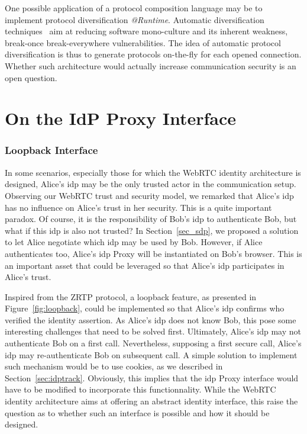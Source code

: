 One possible application of a protocol composition language may be to implement protocol diversification \textit{@Runtime}.
Automatic diversification techniques~\cite{allier15} aim at reducing software mono-culture and its inherent weakness, \ie break-once break-everywhere vulnerabilities.
The idea of automatic protocol diversification is thus to generate protocols on-the-fly for each opened connection.
Whether such architecture would actually increase communication security is an open question.


\section{On the IdP Proxy Interface}
\label{sec:peproxy}
\subsubsection{Loopback Interface}
In some scenarios, especially those for which the WebRTC identity architecture is designed, Alice's \gls{idp} may be the only trusted actor in the communication setup.
Observing our WebRTC trust and security model, we remarked that Alice's \gls{idp} has no influence on Alice's trust in her security.
This is a quite important paradox.
Of course, it is the responsibility of Bob's \gls{idp} to authenticate Bob, but what if this \gls{idp} is also not trusted?
In Section~\ref{sec_sdp}, we proposed a solution to let Alice negotiate which \gls{idp} may be used by Bob.
However, if Alice authenticates too, Alice's \gls{idp} Proxy will be instantiated on Bob's browser.
This is an important asset that could be leveraged so that Alice's \gls{idp} participates in Alice's trust.

Inspired from the ZRTP protocol, a loopback feature, as presented in Figure~\ref{fig:loopback}, could be implemented so that Alice's \gls{idp} confirms who verified the identity assertion.
As Alice's \gls{idp} does not know Bob, this pose some interesting challenges that need to be solved first.
Ultimately, Alice's \gls{idp} may not authenticate Bob on a first call.
Nevertheless, supposing a first secure call, Alice's \gls{idp} may re-authenticate Bob on subsequent call.
A simple solution to implement such mechanism would be to use cookies, as we described in Section~\ref{sec:idptrack}.
Obviously, this implies that the \gls{idp} Proxy interface would have to be modified to incorporate this functionnality.
While the WebRTC identity architecture aims at offering an abstract identity interface, this raise the question as to whether such an interface is possible and how it should be designed.

